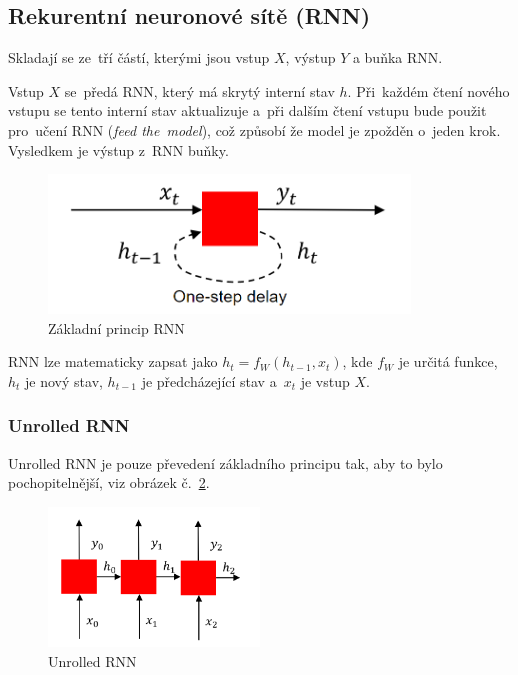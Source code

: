 \subsection{Rekurentní neuronové sítě (RNN)}

Skladají se ze~tří částí, kterými jsou vstup $X$, výstup $Y$ a buňka RNN.

Vstup $X$ se~předá RNN, který má skrytý interní stav $h$.
Při~každém čtení nového vstupu se tento interní stav aktualizuje a~při dalším čtení vstupu bude  použit pro~učení RNN (\emph{feed the~model}), což způsobí že model je zpožděn o~jeden krok.
Vysledkem je výstup z~RNN buňky.

\begin{figure}[h]
    \centering
	\includegraphics[height=10em]{images/09_RNN.png}
    \caption{Základní princip RNN}
    \label{RNN}
\end{figure}

RNN lze matematicky zapsat jako $h_t = f_W(h_{t-1},x_t)$, kde $f_W$ je určitá funkce, $h_t$ je nový stav, $h_{t-1}$ je předcházející stav a~$x_t$ je vstup $X$.

\subsubsection{Unrolled RNN}

Unrolled RNN je pouze převedení základního principu tak, aby to bylo pochopitelnější, viz obrázek č.~\ref{unrolledRNN}.

\begin{figure}[h]
    \centering
	\includegraphics[height=10em]{images/09_unrolled-RNN.png}
    \caption{Unrolled RNN}
    \label{unrolledRNN}
\end{figure}

